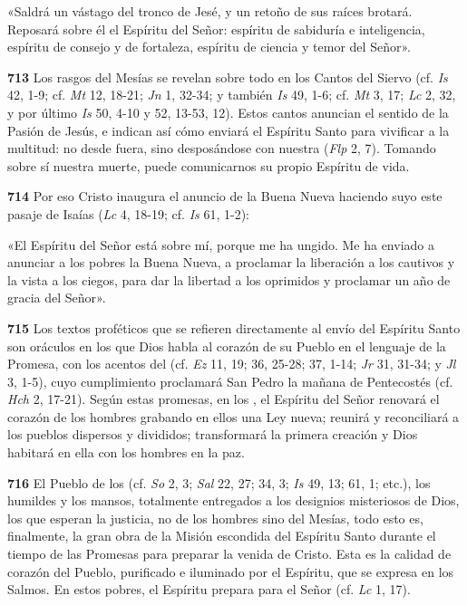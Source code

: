\begin{body}
\begin{body}
«Saldrá un vástago del tronco de Jesé, y un retoño de sus raíces brotará. Reposará sobre él el Espíritu del Señor: espíritu de sabiduría e inteligencia, espíritu de consejo y de fortaleza, espíritu de ciencia y temor del Señor».

\textbf{713} Los rasgos del Mesías se revelan sobre todo en los Cantos del Siervo (cf. \emph{Is} 42, 1-9; cf. \emph{Mt} 12, 18-21; \emph{Jn} 1, 32-34; y también \emph{Is} 49, 1-6; cf. \emph{Mt} 3, 17; \emph{Lc} 2, 32, y por último \emph{Is} 50, 4-10 y 52, 13-53, 12). Estos cantos anuncian el sentido de la Pasión de Jesús, e indican así cómo enviará el Espíritu Santo para vivificar a la multitud: no desde fuera, sino desposándose con nuestra  (\emph{Flp} 2, 7). Tomando sobre sí nuestra muerte, puede comunicarnos su propio Espíritu de vida.

\textbf{714} Por eso Cristo inaugura el anuncio de la Buena Nueva haciendo suyo este pasaje de Isaías (\emph{Lc} 4, 18-19; cf. \emph{Is} 61, 1-2):

«El Espíritu del Señor está sobre mí, porque me ha ungido. Me ha enviado a anunciar a los pobres la Buena Nueva, a proclamar la liberación a los cautivos y la vista a los ciegos, para dar la libertad a los oprimidos y proclamar un año de gracia del Señor».

\textbf{715} Los textos proféticos que se refieren directamente al envío del Espíritu Santo son oráculos en los que Dios habla al corazón de su Pueblo en el lenguaje de la Promesa, con los acentos del  (cf. \emph{Ez} 11, 19; 36, 25-28; 37, 1-14; \emph{Jr} 31, 31-34; y \emph{Jl} 3, 1-5), cuyo cumplimiento proclamará San Pedro la mañana de Pentecostés (cf. \emph{Hch} 2, 17-21). Según estas promesas, en los , el Espíritu del Señor renovará el corazón de los hombres grabando en ellos una Ley nueva; reunirá y reconciliará a los pueblos dispersos y divididos; transformará la primera creación y Dios habitará en ella con los hombres en la paz.

\textbf{716} El Pueblo de los  (cf. \emph{So} 2, 3; \emph{Sal} 22, 27; 34, 3; \emph{Is} 49, 13; 61, 1; etc.), los humildes y los mansos, totalmente entregados a los designios misteriosos de Dios, los que esperan la justicia, no de los hombres sino del Mesías, todo esto es, finalmente, la gran obra de la Misión escondida del Espíritu Santo durante el tiempo de las Promesas para preparar la venida de Cristo. Esta es la calidad de corazón del Pueblo, purificado e iluminado por el Espíritu, que se expresa en los Salmos. En estos pobres, el Espíritu prepara para el Señor  (cf. \emph{Lc} 1, 17).


\end{body}
\end{body}
